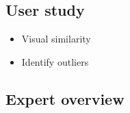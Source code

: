 \subsection{User study}
\begin{itemize}[noitemsep]
    \item Visual similarity
    \item Identify outliers
\end{itemize}

\subsection{Expert overview}

